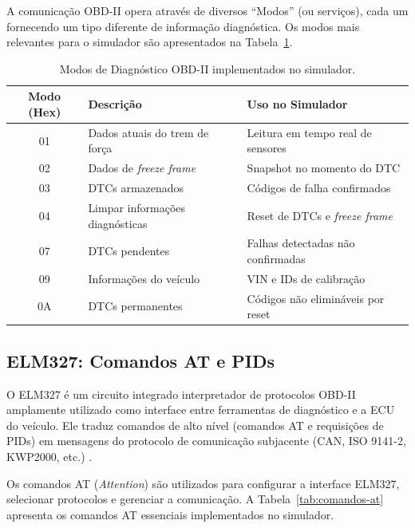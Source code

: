 A comunicação OBD-II opera através de diversos ``Modos'' (ou serviços), cada um fornecendo um tipo diferente de informação diagnóstica. Os modos mais relevantes para o simulador são apresentados na Tabela~\ref{tab:modos-obd}.

\begin{table}[H]
\centering
\caption{Modos de Diagnóstico OBD-II implementados no simulador.}
\label{tab:modos-obd}
\begin{tabular}{@{}cll@{}}
\toprule
\textbf{Modo (Hex)} & \textbf{Descrição} & \textbf{Uso no Simulador} \\
\midrule
01 & Dados atuais do trem de força & Leitura em tempo real de sensores \\
02 & Dados de \textit{freeze frame} & Snapshot no momento do DTC \\
03 & DTCs armazenados & Códigos de falha confirmados \\
04 & Limpar informações diagnósticas & Reset de DTCs e \textit{freeze frame} \\
07 & DTCs pendentes & Falhas detectadas não confirmadas \\
09 & Informações do veículo & VIN e IDs de calibração \\
0A & DTCs permanentes & Códigos não elimináveis por reset \\
\bottomrule
\end{tabular}
\end{table}

\subsection{ELM327: Comandos AT e PIDs}

O ELM327 é um circuito integrado interpretador de protocolos OBD-II amplamente utilizado como interface entre ferramentas de diagnóstico e a ECU do veículo. Ele traduz comandos de alto nível (comandos AT e requisições de PIDs) em mensagens do protocolo de comunicação subjacente (CAN, ISO 9141-2, KWP2000, etc.) \cite{elm327_datasheet}.

Os comandos AT (\textit{Attention}) são utilizados para configurar a interface ELM327, selecionar protocolos e gerenciar a comunicação. A Tabela~\ref{tab:comandos-at} apresenta os comandos AT essenciais implementados no simulador.


